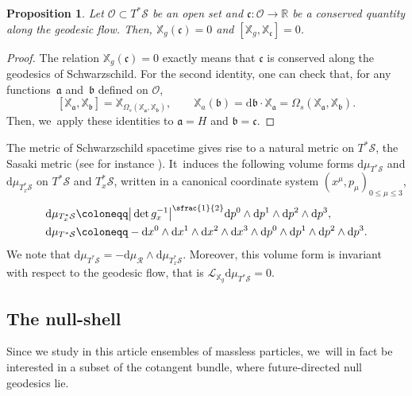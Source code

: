 \documentclass[10pt]{amsart}
\theoremstyle{plain}
\newtheorem{proposition}{Proposition}[section]
\theoremstyle{definition}
\newcommand\R{{\mathbb{R}}}
\newcommand\T{{\mathbb{X}}}
\newcommand\dr{{\mathrm{d}}}
\begin{document}
\begin{proposition}
Let $\mathcal{O} \subset T^* \mathcal{S}$ be an open set and $\mathfrak{c} : \mathcal{O} \to \R$ be a conserved quantity along the geodesic flow. Then, $\T_g (\mathfrak{c})=0$ and $[\T_g, \T_{\mathfrak{c}}]=0$.
\end{proposition}
\begin{proof}
The relation $\T_g (\mathfrak{c})=0$ exactly means that $\mathfrak{c}$ is conserved along the geodesics of Schwarzschild. For the second identity, one can check that, for any functions~$\mathfrak{a}$ and~$\mathfrak{b}$ defined on $\mathcal{O}$,
\[
[\T_{\mathfrak{a}}, \T_{\mathfrak{b}}]= \T_{\Omega_s(\T_{\mathfrak{a}},\T_{\mathfrak{b}})},\qquad \T_a (\mathfrak{b})=\dr \mathfrak{b} \cdot \T_{\mathfrak{a}} = \Omega_s(\T_{\mathfrak{a}},\T_{\mathfrak{b}}).
\]
Then, we~apply these identities to $\mathfrak{a}=H$ and $\mathfrak{b}=\mathfrak{c}$.
\end{proof}

The metric of Schwarzschild spacetime gives rise to a natural metric on $T^* \mathcal{S}$, the Sasaki metric (see for instance \cite[\S II.D]{AGS}). It~induces the following volume forms $\dr \mu_{T^* \mathcal{S}}$ and $\dr \mu_{T^*_x \mathcal{S}}$ on $T^* \mathcal{S}$ and $T^*_x \mathcal{S}$, written in a canonical coordinate system $(x^\mu,p_\mu)_{0 \leq \mu \leq 3}$,
\begin{align*}
\dr \mu_{T^*_x \mathcal{S}} & \coloneqq \big|\det g^{-1}_x \big|^{\sfrac{1}{2}} \dr p^0 \wedge \dr p^1 \wedge \dr p^2 \wedge \dr p^3, \\
\dr \mu_{T^* \mathcal{S}}& \coloneqq - \dr x^0 \wedge \dr x^1 \wedge \dr x^2 \wedge \dr x^3 \wedge \dr p^0 \wedge \dr p^1 \wedge \dr p^2 \wedge \dr p^3.
\end{align*}
We note that $\dr \mu_{T^* \mathcal{S}}= - \dr \mu_{\mathcal{R}} \wedge \dr \mu_{T^*_x \mathcal{S}}$. Moreover, this volume form is invariant with respect to the geodesic flow, that is $\mathcal{L}_{\T_g}\dr \mu_{T^* \mathcal{S}}=0$.

\subsection{The null-shell}\label{Subsecnullshell}

Since we study in this article ensembles of massless particles, we~will in fact be interested in a subset of the cotangent bundle, where future-directed null geodesics lie.
\end{document}
